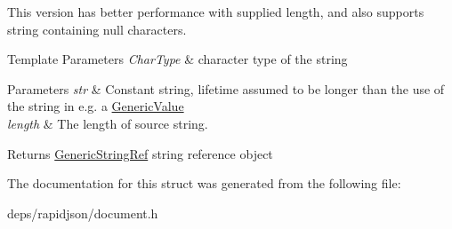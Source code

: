 This version has better performance with supplied length, and also supports string containing null characters.


\begin{DoxyTemplParams}{Template Parameters}
{\em Char\+Type} & character type of the string \\
\hline
\end{DoxyTemplParams}

\begin{DoxyParams}{Parameters}
{\em str} & Constant string, lifetime assumed to be longer than the use of the string in e.\+g. a \hyperlink{class_generic_value}{Generic\+Value} \\
\hline
{\em length} & The length of source string. \\
\hline
\end{DoxyParams}
\begin{DoxyReturn}{Returns}
\hyperlink{struct_generic_string_ref}{Generic\+String\+Ref} string reference object 
\end{DoxyReturn}


The documentation for this struct was generated from the following file\+:\begin{DoxyCompactItemize}
\item 
deps/rapidjson/document.\+h\end{DoxyCompactItemize}

